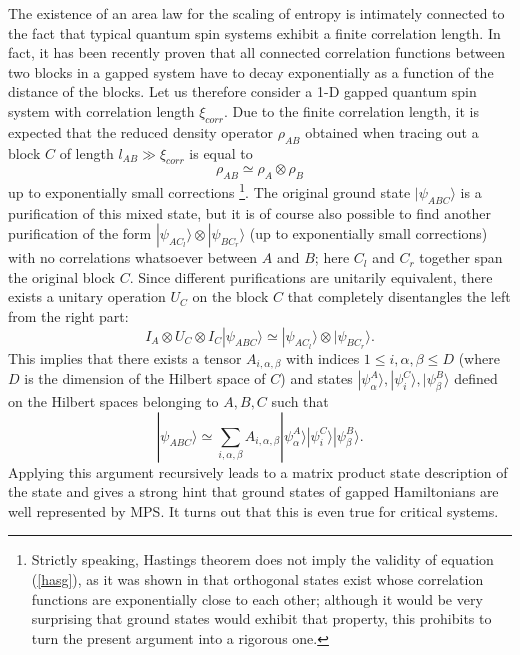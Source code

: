 \documentclass[aps,prl,epsfig,graphics,floatfix,mathbbm,a4paper]{article}
\newcommand{\1}{\mathbbm{1}}
\renewcommand{\>}{\rangle}
\newcommand{\<}{\langle}
\begin{document}
The existence of an area law for the scaling of entropy is
intimately connected to the fact that typical quantum spin systems
exhibit a finite correlation length. In fact, it has been recently
proven \cite{hastings1} that all connected correlation functions
between two blocks in a gapped system have to decay exponentially
as a function of the distance of the blocks. Let us therefore
consider a 1-D gapped quantum spin system with correlation length
$\xi_{corr}$. Due to the finite correlation length, it is expected
that the reduced density operator $\rho_{AB}$ obtained when
tracing out a block $C$ of length $l_{AB}\gg \xi_{corr}$ is equal
to
\begin{equation} \rho_{AB}\simeq
    \rho_A\otimes\rho_B\label{hasg}\end{equation} up to exponentially
small corrections \footnote{Strictly speaking, Hastings theorem
    does not imply the validity of equation (\ref{hasg}), as it was
    shown in \cite{datahiding} that orthogonal states exist whose
    correlation functions are exponentially close to each other;
    although it would be very surprising that ground states would
    exhibit that property, this prohibits to turn the present argument
    into a rigorous one.}. The original ground state
$|\psi_{ABC}\rangle$ is a purification of this mixed state, but it
is of course also possible to find another purification of the
form $|\psi_{AC_l}\rangle\otimes|\psi_{BC_r}\rangle$ (up to
exponentially small corrections) with no correlations whatsoever
between $A$ and $B$; here $C_l$ and $C_r$ together span the
original block $C$. Since different purifications are unitarily
equivalent, there exists a unitary operation $U_C$ on the block
$C$ that completely disentangles the left from the right part:
\[I_A\otimes U_{C}\otimes I_C|\psi_{ABC}\rangle\simeq|\psi_{AC_l}\rangle\otimes|\psi_{BC_r}\rangle.\]
This implies that there exists a tensor $A_{i,\alpha,\beta}$ with
indices $1\leq i,\alpha,\beta\leq D$ (where $D$ is the dimension
of the Hilbert space of $C$) and states
$|\psi^A_\alpha\rangle,|\psi_i^C\rangle,|\psi^B_\beta\rangle$
defined on the Hilbert spaces belonging to $A,B,C$ such that
\[|\psi_{ABC}\rangle\simeq \sum_{i,\alpha,\beta}A_{i,\alpha,\beta}|\psi^A_\alpha\rangle|\psi^C_i\rangle|\psi^B_\beta\rangle.\]
Applying this argument recursively leads to a matrix product state
description of the state and gives a strong hint that ground
states of gapped Hamiltonians are well represented by MPS. It
turns out that this is even true for critical systems.
\end{document}
